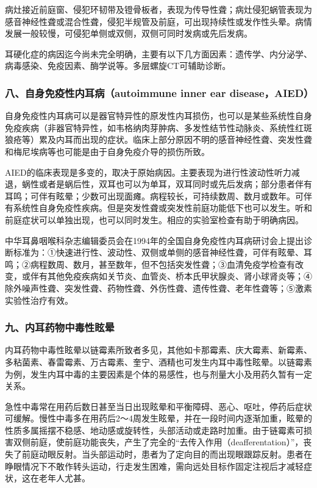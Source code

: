 病灶接近前庭窗、侵犯环韧带及镫骨板者，表现为传导性聋；病灶侵犯蜗管表现为感音神经性聋或混合性聋，侵犯半规管及前庭，可出现持续性或发作性头晕。病情发展一般较慢，可侵犯单侧或双侧，双侧可同时发病或先后发病。

耳硬化症的病因迄今尚未完全明确，主要有以下几方面因素：遗传学、内分泌学、病毒感染、免疫因素、酶学说等。多层螺旋CT可辅助诊断。

\subsubsection{八、自身免疫性内耳病（autoimmune inner ear disease，AIED）}

自身免疫性内耳病可以是器官特异性的原发性内耳损伤，也可以是某些系统性自身免疫疾病（非器官特异性，如韦格纳肉芽肿病、多发性结节性动脉炎、系统性红斑狼疮等）累及内耳而出现的症状。临床上部分原因不明的感音神经性聋、突发性聋和梅尼埃病等也可能是由于自身免疫介导的损伤所致。

AIED的临床表现是多变的，取决于原始病因。主要表现为进行性波动性听力减退，蜗性或者是蜗后性，双耳也可以为单耳，双耳同时或先后发病；部分患者伴有耳鸣；可伴有眩晕；少数可出现面瘫。病程较长，可持续数周、数月或数年。可伴有系统性自身免疫性疾病。但是突发性聋或突发性前庭功能低下也可以发生。听和前庭症状可以单独出现，也可以同时发生。相应的实验室检查有助于明确病因。

中华耳鼻咽喉科杂志编辑委员会在1994年的全国自身免疫性内耳病研讨会上提出诊断标准为：①快速进行性、波动性、双侧或单侧的感音神经性聋，可伴有眩晕、耳鸣；②病程数周、数月，甚至数年，但不包括突发性聋；③血清免疫学检查有改变，或伴有其他免疫疾病如关节炎、血管炎、桥本氏甲状腺炎、肾小球肾炎等；④除外噪声性聋、突发性聋、药物性聋、外伤性聋、遗传性聋、老年性聋等；⑤激素实验性治疗有效。

\subsubsection{九、内耳药物中毒性眩晕}

内耳药物中毒性眩晕以链霉素所致者多见，其他如卡那霉素、庆大霉素、新霉素、多粘菌素、春雷霉素、万古霉素、奎宁、酒精也可发生内耳中毒性眩晕。以链霉素为例，发生内耳中毒的主要因素是个体的易感性，也与剂量大小及用药久暂有一定关系。

急性中毒常在用药后数日甚至当日出现眩晕和平衡障碍、恶心、呕吐，停药后症状可缓解。慢性中毒多在用药后2～4周发生眩晕，并在一段时间内逐渐加重，眩晕的性质多属摇摆不稳感、地动感或旋转性，头部活动或走路时加重。由于链霉素可损害双侧前庭，使前庭功能丧失，产生了完全的“去传入作用（deafferentation）”，丧失了前庭动眼反射。当头部运动时，患者为了定向目的而出现眼跟踪反射。患者在睁眼情况下不敢作转头运动，行走发生困难，需向远处目标作固定注视后才减轻症状，这在老年人尤甚。

